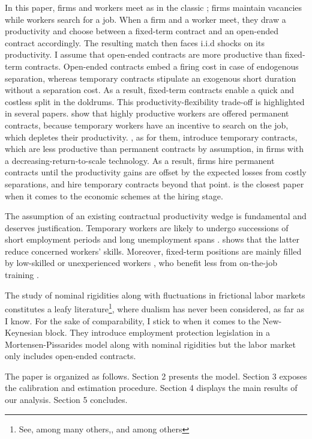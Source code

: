 In this paper, firms and workers meet as in the classic \citet{mortensen1994job} ; firms maintain vacancies while workers search for a job. When a firm and a worker meet, they draw a productivity and choose between a fixed-term contract and an open-ended contract accordingly. The resulting match then faces i.i.d shocks on its productivity. I assume that open-ended contracts are more productive than fixed-term contracts. Open-ended contracts embed a firing cost in case of endogenous separation, whereas temporary contracts stipulate an exogenous short duration without a separation cost. As a result, fixed-term contracts enable a quick and costless split in the doldrums. This productivity-flexibility trade-off is highlighted in several papers. \citet{cao2010fixed} show that highly productive workers are offered permanent contracts, because temporary workers have an incentive to search on the job, which depletes their productivity. \citet{10.2307/20485287}, as for them, introduce temporary contracts, which are less productive than permanent contracts by assumption, in firms with a decreasing-return-to-scale technology. As a result, firms hire permanent contracts until the productivity gains are offset by the expected losses from costly separations, and hire temporary contracts beyond that point. \citet{rion:halshs-02331887} is the closest paper when it comes to the economic schemes at the hiring stage.

The assumption of an existing contractual productivity wedge is fundamental and deserves justification. Temporary workers are likely to undergo successions of short employment periods and long unemployment spans \citep{fontaine2016cdd}. \citet{pissarides1992loss} shows that the latter reduce concerned  workers' skills. Moreover, fixed-term positions are mainly filled by low-skilled or unexperienced workers \citep{fontaine2016cdd}, who benefit less from on-the-job training \citep{doi:10.1111/1467-8543.00106,10.1162/154247604323068041,Albert2005,10.1093/esr/jcs011}.

The study of nominal rigidities along with fluctuations in frictional labor markets constitutes a leafy literature\footnote{See, among many others,\citet{gertler2008estimated}, \citet{trigari2009equilibrium} and \citet{christiano2016unemployment} among others}, where dualism has never been considered, as far as I know.  For the sake of comparability, I stick to \citet{thomas2009labor} when it comes to the New-Keynesian block. They introduce employment protection legislation in a Mortensen-Pissarides model along with nominal rigidities but the labor market only includes open-ended contracts.

The paper is organized as follows. Section 2 presents the model. Section 3 exposes the calibration and estimation procedure. Section 4 displays the main results of our analysis. Section 5 concludes.  